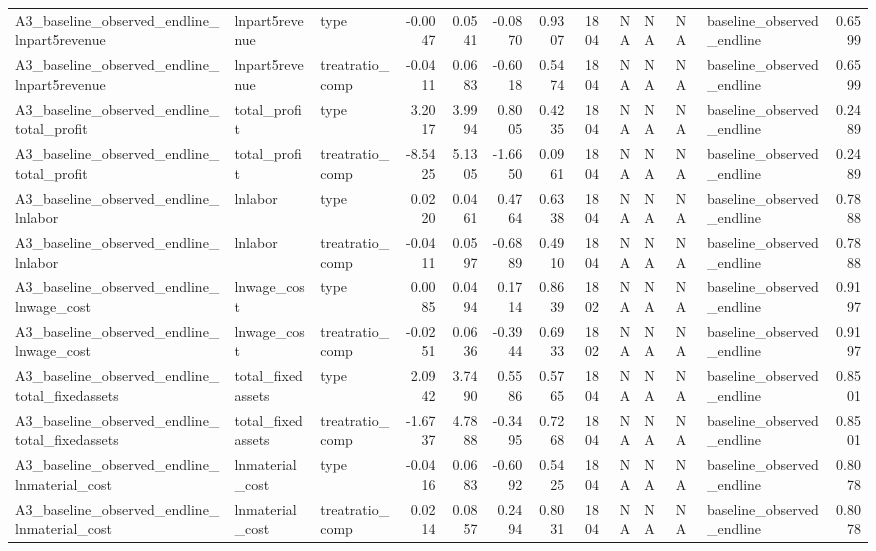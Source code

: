 \begin{table}
\begin{tabular}[t]{lllrrrrrrlllr}
A3\_baseline\_observed\_endline\_lnpart5revenue & lnpart5revenue & type & -0.0047 & 0.0541 & -0.0870 & 0.9307 & 1804 & NA & NA & NA & baseline\_observed\_endline & 0.6599\\
\addlinespace
A3\_baseline\_observed\_endline\_lnpart5revenue & lnpart5revenue & treatratio\_comp & -0.0411 & 0.0683 & -0.6018 & 0.5474 & 1804 & NA & NA & NA & baseline\_observed\_endline & 0.6599\\
A3\_baseline\_observed\_endline\_total\_profit & total\_profit & type & 3.2017 & 3.9994 & 0.8005 & 0.4235 & 1804 & NA & NA & NA & baseline\_observed\_endline & 0.2489\\
A3\_baseline\_observed\_endline\_total\_profit & total\_profit & treatratio\_comp & -8.5425 & 5.1305 & -1.6650 & 0.0961 & 1804 & NA & NA & NA & baseline\_observed\_endline & 0.2489\\
A3\_baseline\_observed\_endline\_lnlabor & lnlabor & type & 0.0220 & 0.0461 & 0.4764 & 0.6338 & 1804 & NA & NA & NA & baseline\_observed\_endline & 0.7888\\
A3\_baseline\_observed\_endline\_lnlabor & lnlabor & treatratio\_comp & -0.0411 & 0.0597 & -0.6889 & 0.4910 & 1804 & NA & NA & NA & baseline\_observed\_endline & 0.7888\\
\addlinespace
A3\_baseline\_observed\_endline\_lnwage\_cost & lnwage\_cost & type & 0.0085 & 0.0494 & 0.1714 & 0.8639 & 1802 & NA & NA & NA & baseline\_observed\_endline & 0.9197\\
A3\_baseline\_observed\_endline\_lnwage\_cost & lnwage\_cost & treatratio\_comp & -0.0251 & 0.0636 & -0.3944 & 0.6933 & 1802 & NA & NA & NA & baseline\_observed\_endline & 0.9197\\
A3\_baseline\_observed\_endline\_total\_fixedassets & total\_fixedassets & type & 2.0942 & 3.7490 & 0.5586 & 0.5765 & 1804 & NA & NA & NA & baseline\_observed\_endline & 0.8501\\
A3\_baseline\_observed\_endline\_total\_fixedassets & total\_fixedassets & treatratio\_comp & -1.6737 & 4.7888 & -0.3495 & 0.7268 & 1804 & NA & NA & NA & baseline\_observed\_endline & 0.8501\\
A3\_baseline\_observed\_endline\_lnmaterial\_cost & lnmaterial\_cost & type & -0.0416 & 0.0683 & -0.6092 & 0.5425 & 1804 & NA & NA & NA & baseline\_observed\_endline & 0.8078\\
\addlinespace
A3\_baseline\_observed\_endline\_lnmaterial\_cost & lnmaterial\_cost & treatratio\_comp & 0.0214 & 0.0857 & 0.2494 & 0.8031 & 1804 & NA & NA & NA & baseline\_observed\_endline & 0.8078\\
\bottomrule
\end{tabular}
\end{table}
